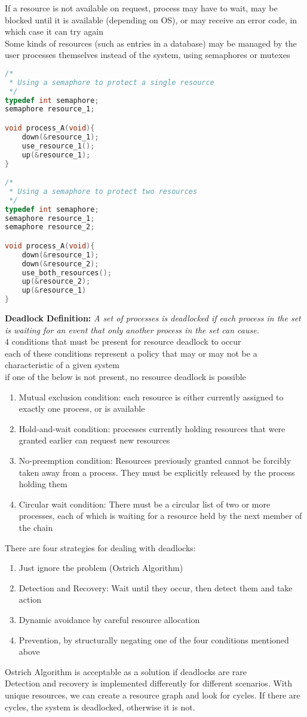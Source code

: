 \documentclass{article}
\begin{document}
If a resource is not available on request, process may have to wait, may be blocked until it is available (depending on OS), or may receive an error code, in which case it can try again
\\Some kinds of resources (such as entries in a database) may be managed by the user processes themselves instead of the system, using semaphores or mutexes
\begin{lstlisting}[language=C]
/*
 * Using a semaphore to protect a single resource
 */
typedef int semaphore;
semaphore resource_1;

void process_A(void){
	down(&resource_1);
	use_resource_1();
	up(&resource_1);
}

/*
 * Using a semaphore to protect two resources
 */
typedef int semaphore;
semaphore resource_1;
semaphore resource_2;

void process_A(void){
	down(&resource_1);
	down(&resource_2);
	use_both_resources();
	up(&resource_2);
	up(&resource_1)
}
\end{lstlisting}
\textbf{Deadlock Definition:} \textit{A set of processes is deadlocked if each process in the set is waiting for an event that only another process in the set can cause.} 
\\4 conditions that must be present for resource deadlock to occur
\\each of these conditions represent a policy that may or may not be a characteristic of a given system
\\if one of the below is not present, no resource deadlock is possible
\begin{enumerate}
	\item Mutual exclusion condition: each resource is either currently assigned to exactly one process, or is available
	\item Hold-and-wait condition: processes currently holding resources that were granted earlier can request new resources
	\item No-preemption condition: Resources previously granted cannot be forcibly taken away from a process. They must be explicitly released by the process holding them
	\item Circular wait condition: There must be a circular list of two or more processes, each of which is waiting for a resource held by the next member of the chain
\end{enumerate}
There are four strategies for dealing with deadlocks:
\begin{enumerate}
	\item Just ignore the problem (Ostrich Algorithm)
	\item Detection and Recovery: Wait until they occur, then detect them and take action
	\item Dynamic avoidance by careful resource allocation
	\item Prevention, by structurally negating one of the four conditions mentioned above
\end{enumerate}
Ostrich Algorithm is acceptable as a solution if deadlocks are rare
\\Detection and recovery is implemented differently for different scenarios. With unique resources, we can create a resource graph and look for cycles. If there are cycles, the system is deadlocked, otherwise it is not.
\end{document}
